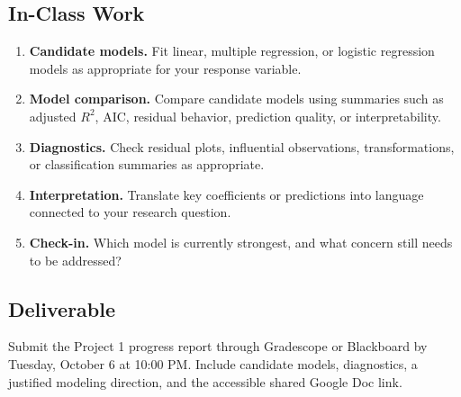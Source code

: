 \documentclass{article}
\newcommand{\submissionplatform}{Gradescope or Blackboard}
\newcommand{\duedate}{Tuesday, October 6 at 10:00 PM}
\begin{document}
\subsection*{In-Class Work}
\begin{enumerate}[label={\bfseries (\Alph*)},itemsep=.5em]
  \item \textbf{Candidate models.} Fit linear, multiple regression, or logistic regression models as appropriate for your response variable.
  \item \textbf{Model comparison.} Compare candidate models using summaries such as adjusted $R^2$, AIC, residual behavior, prediction quality, or interpretability.
  \item \textbf{Diagnostics.} Check residual plots, influential observations, transformations, or classification summaries as appropriate.
  \item \textbf{Interpretation.} Translate key coefficients or predictions into language connected to your research question.
  \item \textbf{Check-in.} Which model is currently strongest, and what concern still needs to be addressed?
\end{enumerate}

\subsection*{Deliverable}
Submit the Project 1 progress report through \submissionplatform{} by \duedate{}. Include candidate models, diagnostics, a justified modeling direction, and the accessible shared Google Doc link.
\end{document}
